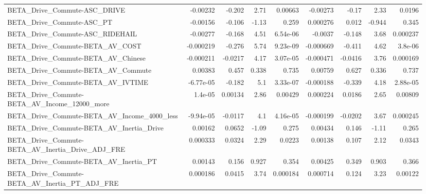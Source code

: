 \begin{tabular}{lrrrrrrrr}
BETA\_Drive\_Commute-ASC\_DRIVE                       &    -0.00232 &       -0.202 &     2.71 &  0.00663 &   -0.00273 &       -0.17 &         2.33 &        0.0196 \\
BETA\_Drive\_Commute-ASC\_PT                          &    -0.00156 &       -0.106 &    -1.13 &    0.259 &   0.000276 &       0.012 &       -0.944 &         0.345 \\
BETA\_Drive\_Commute-ASC\_RIDEHAIL                    &    -0.00277 &       -0.168 &     4.51 & 6.54e-06 &    -0.0037 &      -0.148 &         3.68 &      0.000237 \\
BETA\_Drive\_Commute-BETA\_AV\_COST                    &   -0.000219 &       -0.276 &     5.74 & 9.23e-09 &  -0.000669 &      -0.411 &         4.62 &       3.8e-06 \\
BETA\_Drive\_Commute-BETA\_AV\_Chinese                 &   -0.000211 &      -0.0217 &     4.17 & 3.07e-05 &  -0.000471 &     -0.0416 &         3.76 &      0.000169 \\
BETA\_Drive\_Commute-BETA\_AV\_Commute                 &     0.00383 &        0.457 &    0.338 &    0.735 &    0.00759 &       0.627 &        0.336 &         0.737 \\
BETA\_Drive\_Commute-BETA\_AV\_IVTIME                  &   -6.77e-05 &       -0.182 &      5.1 & 3.33e-07 &  -0.000188 &      -0.339 &         4.18 &      2.88e-05 \\
BETA\_Drive\_Commute-BETA\_AV\_Income\_12000\_more       &     1.4e-05 &      0.00134 &     2.86 &  0.00429 &   0.000224 &      0.0186 &         2.65 &       0.00809 \\
BETA\_Drive\_Commute-BETA\_AV\_Income\_4000\_less        &   -9.94e-05 &      -0.0117 &      4.1 & 4.16e-05 &  -0.000199 &     -0.0202 &         3.67 &      0.000245 \\
BETA\_Drive\_Commute-BETA\_AV\_Inertia\_Drive           &     0.00162 &       0.0652 &    -1.09 &    0.275 &    0.00434 &       0.146 &        -1.11 &         0.265 \\
BETA\_Drive\_Commute-BETA\_AV\_Inertia\_Drive\_ADJ\_FRE   &    0.000333 &       0.0324 &     2.29 &   0.0223 &    0.00138 &       0.107 &         2.12 &        0.0343 \\
BETA\_Drive\_Commute-BETA\_AV\_Inertia\_PT              &     0.00143 &        0.156 &    0.927 &    0.354 &    0.00425 &       0.349 &        0.903 &         0.366 \\
BETA\_Drive\_Commute-BETA\_AV\_Inertia\_PT\_ADJ\_FRE      &    0.000186 &       0.0415 &     3.74 & 0.000184 &   0.000714 &       0.124 &         3.23 &       0.00122 \\

\end{tabular}
